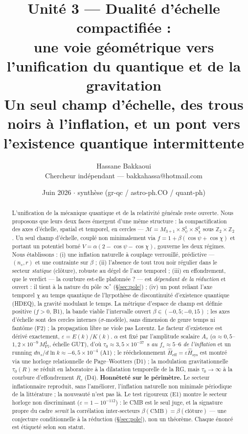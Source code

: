 \documentclass[11pt,a4paper]{article}
\title{\vspace{-1.0cm}\textbf{Unit\'e 3 --- Dualit\'e d'\'echelle compactifi\'ee :\\
une voie g\'eom\'etrique vers l'unification du quantique et de la gravitation}\\[5pt]
\large Un seul champ d'\'echelle, des trous noirs \`a l'inflation, et un pont vers l'existence quantique intermittente}
\author{Hassane Bakkaoui\\ \small Chercheur ind\'ependant --- bakkahassa@hotmail.com}
\date{\small Juin 2026 $\cdot$ synth\`ese (gr-qc / astro-ph.CO / quant-ph)}
\newcommand{\Mpl}{M_{\mathrm{Pl}}}
\newcommand{\Heff}{\hat{H}_{\mathrm{eff}}}
\newcommand{\Hsys}{\hat{H}_{\mathrm{sys}}}
\theoremstyle{definition}
\begin{document}
\maketitle

\begin{abstract}
\noindent
L'unification de la m\'ecanique quantique et de la relativit\'e g\'en\'erale reste ouverte.
Nous proposons que leurs deux faces \'emergent d'une m\^eme structure : la compactification
des axes d'\'echelle, spatial et temporel, en cercles ---
$\mathcal{M}=M_{3+1}\times S^1_\psi\times S^1_\chi$ sous $\mathbb{Z}_2\times\mathbb{Z}_2$. Un
seul champ d'\'echelle, coupl\'e non minimalement via $f=1+\beta(\cos\psi+\cos\chi)$ et portant
un potentiel born\'e $V=\alpha(2-\cos\psi-\cos\chi)$, gouverne les deux r\'egimes. Nous
\'etablissons : (i) une inflation naturelle \`a couplage verrouill\'e, pr\'edictive ---
$(n_s,r)$ et une contrainte sur $\beta$ ; (ii) l'absence de tout trou noir r\'egulier dans le
secteur \emph{statique} (cl\^oture), robuste au d\'egel de l'axe temporel ; (iii) en
effondrement, que le verdict --- la courbure est-elle plafonn\'ee ? --- est
\emph{d\'ependant de la r\'eduction} et ouvert : il tient \`a la nature du p\^ole $\infty^*$
(\S\ref{sec:pole}) ; (iv) un pont reliant l'axe temporel $\chi$ au temps quantique de
l'hypoth\`ese de discontinuit\'e d'existence quantique (HDEQ), la gravit\'e modulant le temps.
La m\'etrique d'espace de champ est d\'efinie positive ($f>0$, B1), la bande viable l'intervalle
ouvert $\beta\in(-0{,}5;-0{,}15)$ ; les axes d'\'echelle sont des cercles internes
($\sigma$-mod\`ele), sans dimension de genre temps ni fant\^ome (F2) ; la propagation libre ne
viole pas Lorentz. Le facteur d'existence est d\'eriv\'e exactement, $\varepsilon=E(k)/K(k)$.
$\alpha$ est fix\'e par l'amplitude scalaire $A_s$ ($\alpha\approx0{,}5$--$1{,}2\times10^{-9}\,\Mpl^4$,
\'echelle GUT), d'o\`u $\tau_0\approx3{,}5\times10^{-37}$~s \emph{au $f_s\approx5$--$6$ de
l'inflation} et un running $dn_s/d\ln k\approx-6{,}5\times10^{-4}$ (A1) ; le r\'e\'echelonnement
$\Heff=\varepsilon\Hsys$ est montr\'e via une horloge relationnelle de Page--Wootters (D1) ; la
modulation gravitationnelle $\tau_0(R)$ se r\'eduit en laboratoire \`a la dilatation
temporelle de la RG, mais $\tau_0\to\infty$ \`a la courbure d'effondrement $R_c$ (D4).
\textbf{Honn\^etet\'e sur le p\'erim\`etre.} Le secteur inflationnaire reproduit, sans
l'am\'eliorer, l'inflation naturelle non minimale p\'eriodique de la litt\'erature ; la
nouveaut\'e n'est pas l\`a. Le test rigoureux (E1) montre le secteur horloge non discriminant
($\varepsilon=1-10^{-112}$) : le CMB est le seul juge, et la signature propre du cadre
\emph{serait} la corr\'elation inter-secteurs $\beta(\mathrm{CMB})=\beta(\text{cl\^oture})$ ---
une conjecture conditionnelle \`a la r\'eduction (\S\ref{sec:pole}), non un th\'eor\`eme. Chaque
\'enonc\'e est \'etiquet\'e selon son statut.


\end{abstract}
\end{document}
